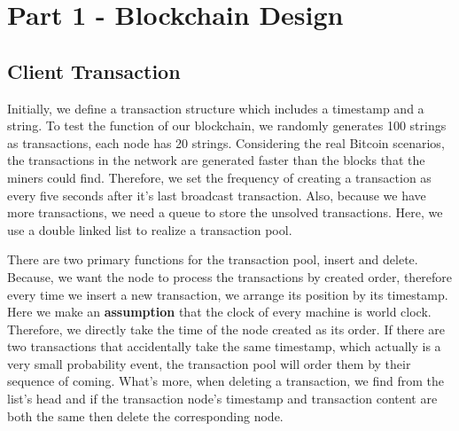 \documentclass{article}
\title{\textmd{\textbf{\date{}} \Class: \Title}\\{\large Instructed by \textit{\ClassInstructor}}\\\normalsize\vspace{0.1in}\small{Due\ on\ \DueDate}}
\author{\textbf{\StudentName}\ \ \StudentClass\ \ \StudentNumber}
\begin{document}
%
%
%
%
%
%
    \section{Part 1 - Blockchain Design}\label{sec:part-1---design}
    \subsection{Client Transaction}

    Initially, we define a transaction structure which includes a timestamp and a string. To test the function of our blockchain, we randomly generates 100 strings as transactions, each node has 20 strings. Considering the real Bitcoin scenarios, the transactions in the network are generated faster than the blocks that the miners could find. Therefore, we set the frequency of creating a transaction as every five seconds after it's last broadcast transaction. Also, because we have more transactions, we need a queue to store the unsolved transactions. Here, we use a double linked list to realize a transaction pool.

    There are two primary functions for the transaction pool, insert and delete. Because, we want the node to process the transactions by created order, therefore every time we insert a new transaction, we arrange its position by its timestamp. Here we make an \textbf{assumption} that the clock of every machine is world clock. Therefore, we directly take the time of the node created as its order. If there are two transactions that accidentally take the same timestamp, which actually is a very small probability event, the transaction pool will order them by their sequence of coming. What's more, when deleting a transaction, we find from the list's head and if the transaction node's timestamp and transaction content are both the same then delete the corresponding node.
\end{document}
